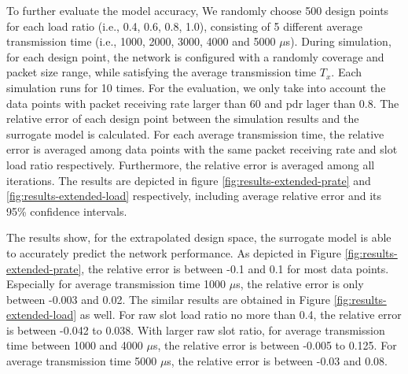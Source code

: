 To further evaluate the model accuracy, We randomly choose 500 design points for each load ratio (i.e., 0.4, 0.6, 0.8, 1.0), consisting of 5 different average transmission time (i.e., 1000, 2000, 3000, 4000 and 5000 $\mu$s). During simulation, for each design point, the network is configured with a randomly coverage and packet size range, while satisfying the average transmission time $T_x$. Each simulation runs for 10 times. For the evaluation, we only take into account the data points with packet receiving rate larger than 60 and \gls{pdr} lager than 0.8. The relative error of each design point between the simulation results and the surrogate model is calculated. For each average transmission time, the relative error is averaged among data points with the same packet receiving rate and slot load ratio respectively. Furthermore, the relative error is averaged among all iterations. The results are depicted in figure \ref{fig:results-extended-prate} and \ref{fig:results-extended-load} respectively, including  average relative error and its 95\% confidence intervals. 



The results show, for the extrapolated design space, the surrogate model is able to accurately predict the network performance. As depicted in Figure \ref{fig:results-extended-prate}, the relative error is between -0.1 and 0.1 for most data points. Especially for average transmission time 1000 $\mu$s, the relative error is only between -0.003 and 0.02. The similar results are obtained in Figure \ref{fig:results-extended-load} as well. For \gls{raw} slot load ratio no more than 0.4, the relative error is between -0.042 to 0.038. With larger \gls{raw} slot ratio, for average transmission time between 1000 and 4000 $\mu$s, the relative error is between -0.005 to 0.125.  For average transmission time 5000 $\mu$s, the relative error is between -0.03 and 0.08.

